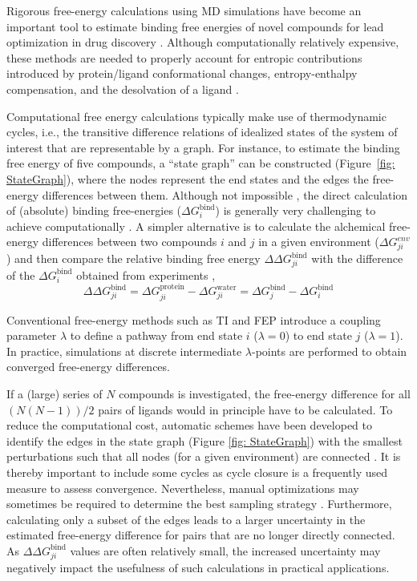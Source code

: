 Rigorous free-energy calculations using MD simulations have become an important tool to estimate binding free energies of novel compounds for lead optimization in drug discovery \cite{Cournia2017, Armacost2020,Cournia2020}. Although computationally relatively expensive, these methods are needed to properly account for entropic contributions introduced by protein/ligand conformational changes, entropy-enthalpy compensation, and the desolvation of a ligand \cite{Chodera2013}.

Computational free energy calculations typically make use of thermodynamic cycles, i.e., the transitive difference relations of idealized states of the system of interest that are representable by a graph. For instance, to estimate the binding free energy of five compounds, a ``state graph'' can be constructed (Figure~\ref{fig: StateGraph}), where the nodes represent the end states and the edges the free-energy differences between them. Although not impossible \cite{Aldeghi2016}, the direct calculation of (absolute) binding free-energies ($\Delta G^\text{bind}_i$) is generally very challenging to achieve computationally \cite{Cournia2017}. A simpler alternative is to calculate the alchemical free-energy differences between two compounds $i$ and $j$ in a given environment ($\Delta G_{ji}^{env}$) and then compare the relative binding free energy $\Delta \Delta G^\text{bind}_{ji}$ with the difference of the $\Delta G^\text{bind}_i$ obtained from experiments \cite{Jorgensen1988b, Merz1991},
\begin{equation}
    \Delta \Delta G^\text{bind}_{ji} = \Delta G_{ji}^{\text{protein}} - \Delta G_{ji}^{\text{water}}
    = \Delta G^\text{bind}_j - \Delta G^\text{bind}_i
\end{equation}

Conventional free-energy methods such as TI \cite{Kirkwood1935} and FEP \cite{Zwanzig1954} introduce a coupling parameter $\lambda$ to define a pathway from end state $i$ ($\lambda=0$) to end state $j$ ($\lambda=1$). In practice, simulations at discrete intermediate $\lambda$-points are performed to obtain converged free-energy differences.

%
If a (large) series of $N$ compounds is investigated, the free-energy difference for all $(N(N-1))/2$ pairs of ligands would in principle have to be calculated. To reduce the computational cost, automatic schemes have been developed to identify the edges in the state graph (Figure \ref{fig: StateGraph}) with the smallest perturbations such that all nodes (for a given environment) are connected \cite{Liu2013,Wang2015,Yang2020}. It is thereby important to include some cycles as cycle closure is a frequently used measure to assess convergence. 
Nevertheless, manual optimizations may sometimes be required to determine the best sampling strategy \cite{Jespers2019}.
Furthermore, calculating only a subset of the edges leads to a larger uncertainty in the estimated free-energy difference for pairs that are no longer directly connected. As $\Delta \Delta G^\text{bind}_{ji}$ values are often relatively small, the increased uncertainty may negatively impact the usefulness of such calculations in practical applications. 

